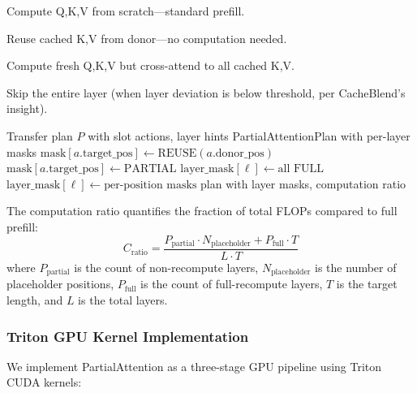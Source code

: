 \documentclass[11pt,twocolumn]{article}
\begin{document}
\begin{description}[leftmargin=*,nosep]
\item[FULL] Compute Q,K,V from scratch---standard prefill.
\item[REUSE] Reuse cached K,V from donor---no computation needed.
\item[PARTIAL] Compute fresh Q,K,V but cross-attend to all cached K,V.
\item[SKIP\_LAYER] Skip the entire layer (when layer deviation is below
  threshold, per CacheBlend's insight).
\end{description}

\begin{algorithm}[t]
\caption{Build PartialAttention Plan}
\label{alg:partial}
\begin{algorithmic}[1]
\Require Transfer plan $P$ with slot actions, layer hints
\Ensure PartialAttentionPlan with per-layer masks
    \State $\text{mask}[a.\text{target\_pos}] \gets \text{REUSE}(a.\text{donor\_pos})$
  \Else
    \State $\text{mask}[a.\text{target\_pos}] \gets \text{PARTIAL}$
  \EndIf
\EndFor
\For{each layer $\ell$ in $[0, L)$}
    \State $\text{layer\_mask}[\ell] \gets \text{all FULL}$
  \Else
    \State $\text{layer\_mask}[\ell] \gets \text{per-position masks}$
  \EndIf
\EndFor
\State \Return plan with layer masks, computation ratio
\end{algorithmic}
\end{algorithm}

The computation ratio quantifies the fraction of total FLOPs compared
to full prefill:
\begin{equation}
  C_\text{ratio} = \frac{P_\text{partial} \cdot N_\text{placeholder} + P_\text{full} \cdot T}{L \cdot T}
  \label{eq:cratio}
\end{equation}
where $P_\text{partial}$ is the count of non-recompute layers,
$N_\text{placeholder}$ is the number of placeholder positions,
$P_\text{full}$ is the count of full-recompute layers, $T$ is the target
length, and $L$ is the total layers.


\subsubsection{Triton GPU Kernel Implementation}
\label{sec:triton}

We implement PartialAttention as a three-stage GPU pipeline using
Triton~\cite{triton} CUDA kernels:
\end{document}
